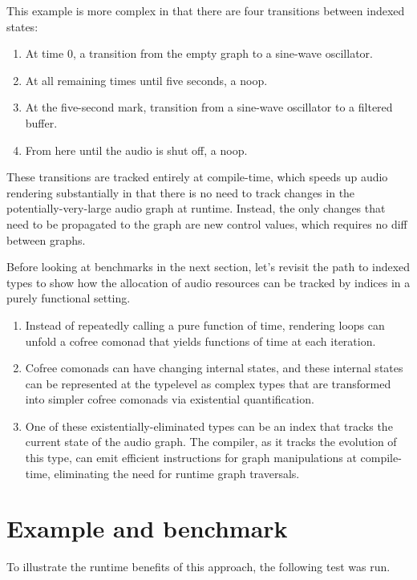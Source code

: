 \documentclass{article}
\begin{document}
This example is more complex in that there are four transitions between indexed states:
\begin{enumerate}
  \item At time 0, a transition from the empty graph to a sine-wave oscillator.
  \item At all remaining times until five seconds, a noop.
  \item At the five-second mark, transition from a sine-wave oscillator to a filtered buffer.
  \item From here until the audio is shut off, a noop.
\end{enumerate}

These transitions are tracked entirely at compile-time, which speeds up audio rendering substantially in that there is no need to track changes in the potentially-very-large audio graph at runtime. Instead, the only changes that need to be propagated to the graph are new control values, which requires no diff between graphs.

Before looking at benchmarks in the next section, let's revisit the path to indexed types to show how the allocation of audio resources can be tracked by indices in a purely functional setting.

\begin{enumerate}
  \item Instead of repeatedly calling a pure function of time, rendering loops can unfold a cofree comonad that yields functions of time at each iteration.
  \item Cofree comonads can have changing internal states, and these internal states can be represented at the typelevel as complex types that are transformed into simpler cofree comonads via existential quantification.
  \item One of these existentially-eliminated types can be an index that tracks the current state of the audio graph. The compiler, as it tracks the evolution of this type, can emit efficient instructions for graph manipulations at compile-time, eliminating the need for runtime graph traversals.
\end{enumerate}

\section{Example and benchmark}
\label{sec:example_and_benchmark}

To illustrate the runtime benefits of this approach, the following test was run.
\end{document}
